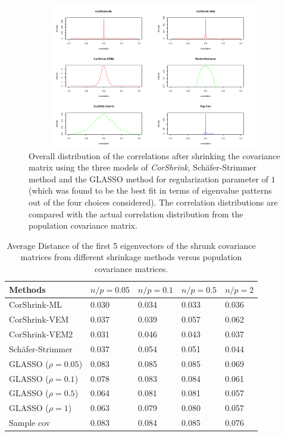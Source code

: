 \begin{figure}[ht]
\centering
\includegraphics[height=2.5in, width=5in]{correlation_density_compare}
 \caption{Overall distribution of the correlations after shrinking the covariance matrix using the three models of \textit{CorShrink}, Sch\"{a}fer-Strimmer method and the GLASSO method for regularization parameter of $1$ (which was found to be the best fit in terms of eigenvalue patterns out of the four choices considered). The correlation distributions are compared with the actual correlation distribution from the population covariance matrix.}
\label{fig:fig2}
\end{figure}

\clearpage
\begin{table}[ht]
\begin{center}
\caption{Average Distance of the first 5 eigenvectors of the shrunk covariance matrices from different shrinkage methods versus population covariance matrices. \label{tab:tab2}}
\begin{tabular}{|p{1.5in}|p{0.8in}|p{0.8in}|p{0.8in}|p{0.8in}|}
 \hline
 Methods &  $n/p=0.05$ & $n/p=0.1$ & $n/p=0.5$ & $n/p=2$ \\ \hline
 CorShrink-ML & 0.030 &  0.034  &  0.033  &  0.036 \\ \hline
 CorShrink-VEM  &  0.037  &  0.039  & 0.057  & 0.062 \\ \hline
 CorShrink-VEM2 & 0.031 & 0.046 & 0.043 & 0.037 \\ \hline
 Sch\"{a}fer-Strimmer & 0.037 & 0.054 & 0.051 &  0.044 \\ \hline
 GLASSO ($\rho=0.05$) & 0.083 & 0.085 & 0.085 & 0.069 \\ \hline
 GLASSO ($\rho=0.1$) & 0.078 & 0.083 & 0.084 & 0.061 \\ \hline
 GLASSO ($\rho=0.5$) & 0.064 & 0.081 & 0.081 & 0.057 \\ \hline
 GLASSO ($\rho=1$) & 0.063 & 0.079 & 0.080 & 0.057 \\ \hline
 Sample cov  & 0.083 & 0.084 & 0.085 & 0.076 \\ 
 \hline	
\end{tabular}
\end{center}
 \end{table}
 
